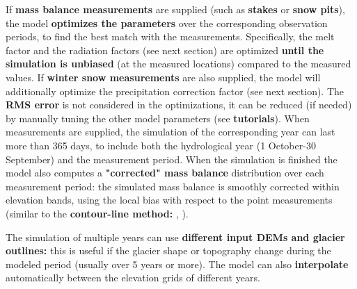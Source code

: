 \documentclass[15pt]{extarticle}
\begin{document}
If \textbf{mass balance measurements} are supplied (such as \textbf{stakes} or \textbf{snow pits}), the model \textbf{optimizes the parameters} over the corresponding observation periods, to find the best match with the measurements. Specifically, the melt factor and the radiation factors (see next section) are optimized \textbf{until the simulation is unbiased} (at the measured locations) compared to the measured values. If \textbf{winter snow measurements} are also supplied, the model will additionally optimize the precipitation correction factor (see next section). The \textbf{RMS error} is not considered in the optimizations, it can be reduced (if needed) by manually tuning the other model parameters (see \textbf{tutorials}). When measurements are supplied, the simulation of the corresponding year can last more than 365 days, to include both the hydrological year (1 October-30 September) and the measurement period. When the simulation is finished the model also computes a \textbf{"corrected" mass balance} distribution over each measurement period: the simulated mass balance is smoothly corrected within elevation bands, using the local bias with respect to the point measurements (similar to the \textbf{contour-line method:} \citeauthor{ostrem_glacier_1991}, \citeyear{ostrem_glacier_1991}).

The simulation of multiple years can use \textbf{different input DEMs and glacier outlines:} this is useful if the glacier shape or topography change during the modeled period (usually over 5 years or more). The model can also \textbf{interpolate} automatically between the elevation grids of different years.
\end{document}
